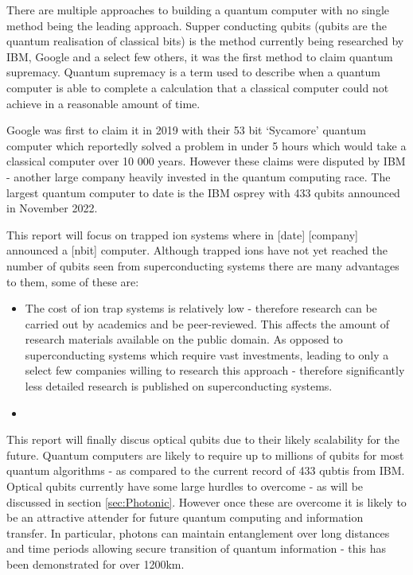 There are multiple approaches to building a quantum computer with no single method being the leading approach.
Supper conducting qubits (qubits are the quantum realisation of classical bits) is the method currently being researched by IBM, Google and a select few others, it was the first method to claim quantum supremacy. \cite{gibney_hello_2019}
Quantum supremacy is a term used to describe when a quantum computer is able to complete a calculation that a classical computer could not achieve in a reasonable amount of time. 

Google was first to claim it in 2019 with their 53 bit `Sycamore' quantum computer which reportedly solved a problem in under 5 hours which would take a classical computer over 10 000 years. \cite{gibney_hello_2019} 
However these claims were disputed by IBM - another large company heavily invested in the quantum computing race.
The largest quantum computer to date is the IBM osprey with 433 qubits announced in November 2022.
\vspac{1em}

This report will focus on trapped ion systems where in [date] [company] announced a [nbit] computer. Although trapped ions have not yet reached the number of qubits seen from superconducting systems there are many advantages to them, some of these are: 
\begin{itemize}
    \item The cost of ion trap systems is relatively low - therefore research can be carried out by academics and be peer-reviewed. This affects the amount of research materials available on the public domain. As opposed to superconducting systems which require vast investments, leading to only a select few companies willing to research this approach - therefore significantly less detailed research is published on superconducting systems. 
    \item 
\end{itemize}

This report will finally discus optical qubits due to their likely scalability for the future. 
Quantum computers are likely to require up to millions of qubits for most quantum algorithms - as compared to the current record of 433 qubtis from IBM. \cite{bergou_quantum_2021} 
Optical qubits currently have some large hurdles to overcome - as will be discussed in section \ref{sec:Photonic}. However once these are overcome it is likely to be an attractive attender for future quantum computing and information transfer.
In particular, photons can maintain entanglement over long distances and time periods allowing secure transition of quantum information - this has been demonstrated for over 1200km. \cite{yin_satellite-based_2017}